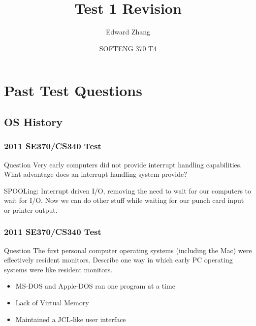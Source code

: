 \documentclass{beamer}
\title[SOFTENG 370 Tutorial 4 (2019)] %
{Test 1 Revision}
\author{Edward Zhang}
\date[August 2019] %
{SOFTENG 370 T4}
\begin{document}
\frame{\titlepage}
\section{Past Test Questions}
\subsection{OS History}
\begin{frame}
  \frametitle{2011 SE370/CS340 Test}
  \begin{block}{Question}
    Very early computers did not provide interrupt handling capabilities. What advantage does an interrupt handling system provide?
  \end{block}
  \pause
  SPOOLing: Interrupt driven I/O, removing the need to wait for our computers to wait for I/O. Now we can do other stuff while waiting for our punch card input or printer output.
\end{frame}
\begin{frame}
  \frametitle{2011 SE370/CS340 Test}
  \begin{block}{Question}
    The first personal computer operating systems (including the Mac) were effectively resident monitors. Describe one way in which early PC operating systems were like resident monitors.
  \end{block}
  \pause
  \begin{itemize}
    \item MS-DOS and Apple-DOS ran one program at a time
    \item Lack of Virtual Memory
    \item Maintained a JCL-like user interface
  \end{itemize}
\end{frame}
\end{document}
